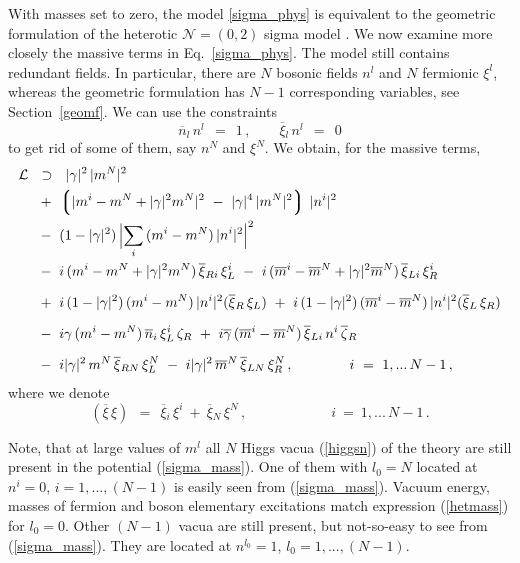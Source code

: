 \documentclass[12pt]{article}
\newcommand{\ntwoo}{${\mathcal N}= \left(0,2\right) $ }
\newcommand{\ov}{\overline}
\newcommand{\mc}[1]{\mathcal{#1}}
\newcommand{\lgr}{\left\lgroup}
\newcommand{\rgr}{\right\rgroup}
\newcommand{\bxir}{\ov{\xi}{}_R}
\newcommand{\bxil}{\ov{\xi}{}_L}
\newcommand{\xir}{\xi_R}
\newcommand{\xil}{\xi_L}
\newcommand{\bzr}{\ov{\zeta}{}_R}
\newcommand{\zr}{\zeta_R}
\begin{document}
	With masses set to zero, the model \eqref{sigma_phys} is equivalent to the 
	geometric formulation of the heterotic \ntwoo sigma model \cite{SYhet,BSYhet}.
	We now examine more closely the massive terms in Eq.~\eqref{sigma_phys}.
	The model still contains redundant fields.
	In particular, there are $N$ bosonic fields $n^l$ and $N$ fermionic $\xi^l$,
	whereas the geometric formulation has $N-1$ corresponding variables, see
	Section~\ref{geomf}.
	We can use the constraints
\[
	\ov{n}{}_l\, n^l ~~=~~ 1\,, \qquad \ov{\xi}{}_l\, n^l ~~=~~ 0
\]
	to get rid of some of them, say $ n^N $ and $ \xi^N $.
	We obtain, for the massive terms,
\begin{align}
%
\notag
	\mc{L} & ~~\supset~~ 
	|\gamma|^2\, |m^N|^2  
	\\
%
\notag
	&~
	~+~
	\lgr | m^i - m^N + |\gamma|^2 m^N |^2 ~-~ |\gamma|^4\, |m^N|^2 \rgr\, |n^i|^2 
	\\
%
\notag
	&~
	~-~ (1 - |\gamma|^2)\, \Bigl|\sum_i\, (m^i - m^N)\,|n^i|^2 \Bigr|^2
	\\
%	
\label{sigma_mass}
	&~
	~-~ i\,(m^i - m^N + |\gamma|^2 m^N )\,\ov{\xi}{}_{Ri}\,\xi_L^i
	~-~ i\,(\ov{m}{}^i - \ov{m}{}^N + |\gamma|^2\ov{m}{}^N)\, \ov{\xi}{}_{Li}\, \xi_R^i 
	\\[2mm]
%
\notag
	&~
	~+~ i\,(1-|\gamma|^2)\,(m^i - m^N)\,|n^i|^2(\bxir\,\xil) 
	~+~ i\,(1-|\gamma|^2)\,(\ov{m}{}^i - \ov{m}{}^N)\,|n^i|^2(\bxil\,\xir)
	\\[2mm]
%
\notag
	&~
	~-~ i \gamma\, (m^i - m^N)\, \ov{n}{}_i\, \xi_L^i\, \zr
	~+~ i \ov{\gamma}\, (\ov{m}{}^i - \ov{m}{}^N)\, \ov{\xi}{}_{Li}\, n^i\, \bzr
	\\[2mm]
%
\notag
	&~
	~-~ i |\gamma|^2\, m^N\, \ov{\xi}{}_{RN}\, \xi_L^N
	~-~ i |\gamma|^2\, \ov{m}^N\, \ov{\xi}{}_{LN}\, \xi_R^N\,,
	\qquad\qquad
	i ~=~ 1,...\,N-1\,,
\end{align}
	where we denote
\[
	(\ov{\xi}\, \xi) ~~=~~ \ov{\xi}{}_i\, \xi^i  ~+~  \ov{\xi}{}_N\, \xi^N\,,
	\qquad\qquad\qquad
	i ~=~ 1,...\,N-1\,.
\]

Note, that at large values of $m^l$ all $N$ Higgs vacua (\ref{higgsn}) of the theory  are
still present in the potential (\ref{sigma_mass}).
One of them with $l_0=N$ located at $n^i=0$, $i=1,...,(N-1)$
is easily seen from (\ref{sigma_mass}). Vacuum energy,
masses of fermion and boson elementary excitations match
expression (\ref{hetmass}) for $l_0=0$. Other $(N-1)$
vacua are still present, but not-so-easy to see from (\ref{sigma_mass}).
They are located at $n^{l_0}=1$, $l_0=1,...,(N-1)$.
\end{document}
